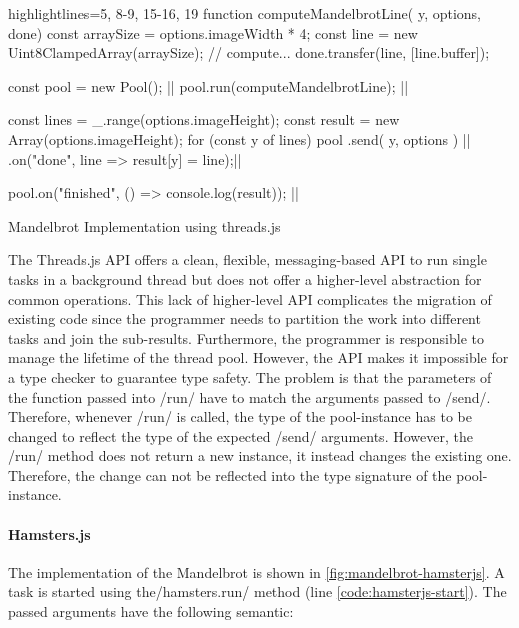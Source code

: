 \begin{listing}
	\begin{javascriptcode*}{highlightlines={5, 8-9, 15-16, 19}}
function computeMandelbrotLine({ y, options}, done) {
	const arraySize = options.imageWidth * 4;
	const line = new Uint8ClampedArray(arraySize);
	// compute...
	done.transfer(line, [line.buffer]);
}

const pool = new Pool(); |$\label{code:threadsjs-pool}$|
pool.run(computeMandelbrotLine); |$\label{code:threadsjs-worker}$|

const lines = _.range(options.imageHeight);
const result = new Array(options.imageHeight);
for (const y of lines) {
	pool
		.send({ y, options }) |$\label{code:threadsjs-messaging}$|
		.on("done", line => result[y] = line);|$\label{code:threadsjs-task-completion}$|
}

pool.on("finished", () => console.log(result)); |$\label{code:threadsjs-done}$|
\end{javascriptcode*}
\caption{Mandelbrot Implementation using threads.js}
\label{fig:mandelbrot-threadsjs}
\end{listing}


The Threads.js API offers a clean, flexible, messaging-based API to run single tasks in a background thread but does not offer a higher-level abstraction for common operations. This lack of higher-level API complicates the migration of existing code since the programmer needs to partition the work into different tasks and join the sub-results. Furthermore, the programmer is responsible to manage the lifetime of the thread pool. However, the API makes it impossible for a type checker to guarantee type safety. The problem is that the parameters of the function passed into \javascriptinline/run/ have to match the arguments passed to \javascriptinline/send/. Therefore, whenever \javascriptinline/run/ is called, the type of the pool-instance has to be changed to reflect the type of the expected \javascriptinline/send/ arguments. However, the \javascriptinline/run/ method does not return a new instance, it instead changes the existing one. Therefore, the change can not be reflected into the type signature of the pool-instance.

\paragraph{Hamsters.js}
The implementation of the Mandelbrot is shown in \cref{fig:mandelbrot-hamsterjs}. A task is started using the\javascriptinline/hamsters.run/ method (line \ref{code:hamsterjs-start}). The passed arguments have the following semantic:

